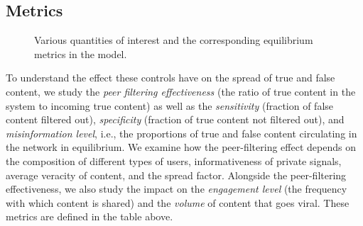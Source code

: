 \subsection{Metrics}




{\small 
\begin{figure}
\centering
{}
\caption{Various quantities of interest and the corresponding equilibrium metrics in the model.}\label{table:metrics}

\end{figure}
}
To understand the effect these controls have on the spread of true and false content, we  study the \emph{peer filtering effectiveness} (the ratio of true content in the system to incoming true content) as well as the \emph{sensitivity} (fraction of false content filtered out), \emph{specificity} (fraction of true content not filtered out), and \emph{misinformation level}, i.e., the proportions of true and false content circulating in the network in equilibrium. We examine how the peer-filtering effect depends on the composition of different types of users, informativeness of private signals, average veracity of content, and the spread factor. Alongside the peer-filtering effectiveness, we also study the impact on the \emph{engagement level} (the frequency with which content is shared) and the \emph{volume} of content that goes viral. These metrics are defined in the table above. 

